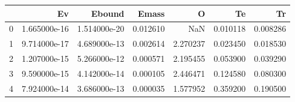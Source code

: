 \begin{tabular}{lrrrrrr}
\toprule
{} &            Ev &        Ebound &     Emass &         O &        Te &        Tr \\
\midrule
0 &  1.665000e-16 &  1.514000e-20 &  0.012610 &       NaN &  0.010118 &  0.008286 \\
1 &  9.714000e-17 &  4.689000e-13 &  0.002614 &  2.270237 &  0.023450 &  0.018530 \\
2 &  1.207000e-15 &  5.266000e-12 &  0.000571 &  2.195455 &  0.053900 &  0.039290 \\
3 &  9.590000e-15 &  4.142000e-14 &  0.000105 &  2.446471 &  0.124580 &  0.080300 \\
4 &  7.924000e-14 &  3.686000e-13 &  0.000035 &  1.577952 &  0.359200 &  0.190500 \\
\bottomrule
\end{tabular}
